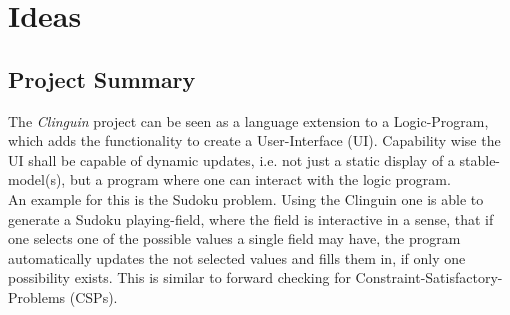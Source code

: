 \documentclass[12pt,a4paper]{article}
\newcommand{\<}[1]{\guilsinglleft}
\renewcommand{\>}[1]{\guilsinglright}
\newcommand{\name}{Alexander Beiser}
\newcommand{\matriculation}{To: The masses}
\begin{document}
\thispagestyle{empty}
\noindent{}
\vspace{0.5cm}





\section{Ideas}


\subsection{Project Summary}

\noindent The \textit{Clinguin} project can be seen as a language extension to a Logic-Program, which adds the functionality to create a User-Interface (UI). Capability wise the UI shall be capable of dynamic updates, i.e. not just a static display of a stable-model(s), but a program where one can interact with the logic program.\\
An example for this is the Sudoku problem. Using the Clinguin one is able to generate a Sudoku playing-field, where the field is interactive in a sense, that if one selects one of the possible values a single field may have, the program automatically updates the not selected values and fills them in, if only one possibility exists. This is similar to forward checking for Constraint-Satisfactory-Problems (CSPs).\\
\end{document}

